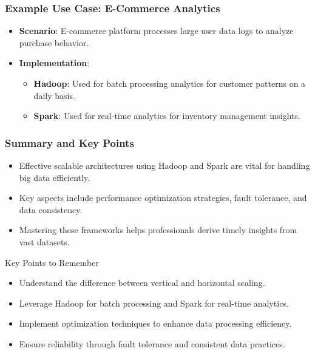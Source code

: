 \documentclass{beamer}
\begin{document}
\begin{frame}[fragile]
    \frametitle{Example Use Case: E-Commerce Analytics}
    \begin{itemize}
        \item \textbf{Scenario}: E-commerce platform processes large user data logs to analyze purchase behavior.
        \item \textbf{Implementation}:
            \begin{itemize}
                \item \textbf{Hadoop}: Used for batch processing analytics for customer patterns on a daily basis.
                \item \textbf{Spark}: Used for real-time analytics for inventory management insights.
            \end{itemize}
    \end{itemize}
\end{frame}

\begin{frame}[fragile]
    \frametitle{Summary and Key Points}
    \begin{itemize}
        \item Effective scalable architectures using Hadoop and Spark are vital for handling big data efficiently.
        \item Key aspects include performance optimization strategies, fault tolerance, and data consistency.
        \item Mastering these frameworks helps professionals derive timely insights from vast datasets.
    \end{itemize}
    
    \begin{block}{Key Points to Remember}
        \begin{itemize}
            \item Understand the difference between vertical and horizontal scaling.
            \item Leverage Hadoop for batch processing and Spark for real-time analytics.
            \item Implement optimization techniques to enhance data processing efficiency.
            \item Ensure reliability through fault tolerance and consistent data practices.
        \end{itemize}
    \end{block}
\end{frame}
\end{document}

